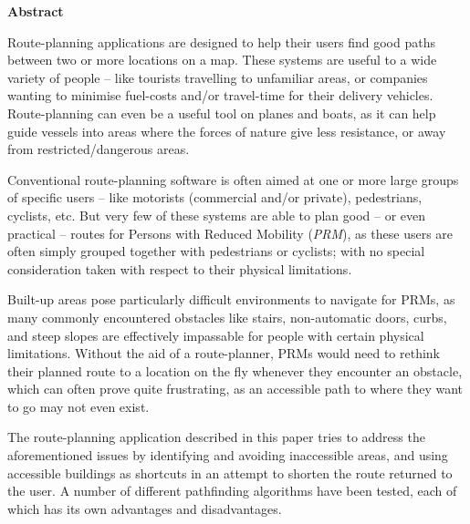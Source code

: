 \thispagestyle{empty}

\begin{center}
    {\LARGE\bf Abstract}
\end{center}





 Route-planning applications are designed to help their users find good paths between two or more locations on a map. These systems are useful to a wide variety of people -- like tourists travelling to unfamiliar areas, or companies wanting to minimise fuel-costs and/or travel-time for their delivery vehicles. Route-planning can even be a useful tool on planes and boats, as it can help guide vessels into areas where the forces of nature give less resistance, or away from restricted/dangerous areas.

Conventional route-planning software is often aimed at one or more large groups of specific users -- like motorists (commercial and/or private), pedestrians, cyclists, etc. But very few of these systems are able to plan good -- or even practical -- routes for Persons with Reduced Mobility (\textit{PRM}), as these users are often simply grouped together with pedestrians or cyclists; with no special consideration taken with respect to their physical limitations.

Built-up areas pose particularly difficult environments to navigate for PRMs, as many commonly encountered obstacles like stairs, non-automatic doors, curbs, and steep slopes are effectively impassable for people with certain physical limitations. Without the aid of a route-planner, PRMs would need to rethink their planned route to a location on the fly whenever they encounter an obstacle, which can often prove quite frustrating, as an accessible path to where they want to go may not even exist.

The route-planning application described in this paper tries to address the aforementioned issues by identifying and avoiding inaccessible areas, and using accessible buildings as shortcuts in an attempt to shorten the route returned to the user. A number of different pathfinding algorithms have been tested, each of which has its own advantages and disadvantages.
